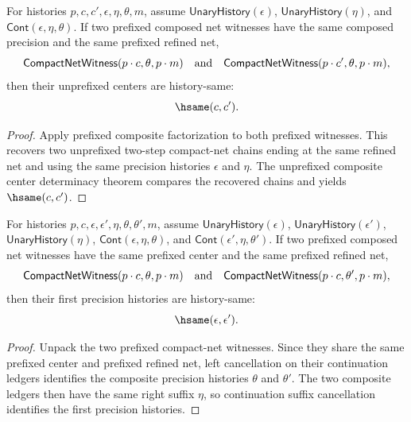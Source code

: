\begin{theorem}
\label{thm:compact-net-witness-prefixed-composite-center-deterministic}
For histories $p,c,c',\epsilon,\eta,\theta,m$, assume
$\mathsf{UnaryHistory}(\epsilon)$, $\mathsf{UnaryHistory}(\eta)$, and
$\mathsf{Cont}(\epsilon,\eta,\theta)$. If two prefixed composed net witnesses
have the same composed precision and the same prefixed refined net,
$$
\mathsf{CompactNetWitness}(p \cdot c,\theta,p \cdot m)
\quad\hbox{and}\quad
\mathsf{CompactNetWitness}(p \cdot c',\theta,p \cdot m),
$$
then their unprefixed centers are history-same:
$$
\hsame(c,c').
$$
\end{theorem}
\begin{proof}
Apply prefixed composite factorization to both prefixed witnesses. This
recovers two unprefixed two-step compact-net chains ending at the same refined
net and using the same precision histories $\epsilon$ and $\eta$. The
unprefixed composite center determinacy theorem compares the recovered chains
and yields $\hsame(c,c')$.
\end{proof}

\begin{theorem}
\label{thm:compact-net-witness-prefixed-composite-precision-deterministic}
For histories $p,c,\epsilon,\epsilon',\eta,\theta,\theta',m$, assume
$\mathsf{UnaryHistory}(\epsilon)$, $\mathsf{UnaryHistory}(\epsilon')$,
$\mathsf{UnaryHistory}(\eta)$,
$\mathsf{Cont}(\epsilon,\eta,\theta)$, and
$\mathsf{Cont}(\epsilon',\eta,\theta')$. If two prefixed composed net witnesses
have the same prefixed center and the same prefixed refined net,
$$
\mathsf{CompactNetWitness}(p \cdot c,\theta,p \cdot m)
\quad\hbox{and}\quad
\mathsf{CompactNetWitness}(p \cdot c,\theta',p \cdot m),
$$
then their first precision histories are history-same:
$$
\hsame(\epsilon,\epsilon').
$$
\end{theorem}
\begin{proof}
Unpack the two prefixed compact-net witnesses. Since they share the same
prefixed center and prefixed refined net, left cancellation on their
continuation ledgers identifies the composite precision histories
$\theta$ and $\theta'$. The two composite ledgers then have the same right
suffix $\eta$, so continuation suffix cancellation identifies the first
precision histories.
\end{proof}

